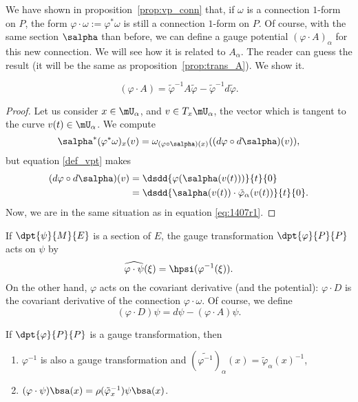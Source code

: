 We have shown in proposition~\ref{prop:vp_conn} that, if $\omega$ is a connection $1$-form on $P$, the form $\varphi\cdot\omega:=\varphi^*\omega$ is still a connection $1$-form on $P$. Of course, with the same section $\salpha$ than before, we can define a gauge potential $(\varphi\cdot A)_{\alpha}$ for this new connection. We will see how it is related to $A_{\alpha}$. The reader can guess the result (it will be the same as proposition~\ref{prop:trans_A}). We show it.

\begin{proposition}		\label{Proptr_de_A}
\begin{equation}\label{tr_de_A}
     (\varphi\cdot A)=\tilde{\varphi}^{-1} A\tilde{\varphi}-\tilde{\varphi}^{-1} d\tilde{\varphi}.
\end{equation}
\end{proposition}
\begin{proof}
Let us consider $x\in\mU_{\alpha}$, and $v\in T_x\mU_{\alpha}$, the vector which is tangent to the curve $v(t)\in\mU_{\alpha}$. We compute
\[
    \salpha^*(\varphi^*\omega)_x(v)=\omega_{(\varphi\circ\salpha)(x)}((d\varphi\circ d\salpha)(v)),
\]
but equation \eqref{def_vpt} makes
\begin{equation}
\begin{split}
   (d\varphi\circ d\salpha)(v)&=\dsdd{\varphi(\salpha(v(t)))}{t}{0}\\
                          &=\dsdd{\salpha(v(t))\cdot\tilde{\varphi}_{\alpha}(v(t))}{t}{0}.
\end{split}
\end{equation}
Now, we are in the same situation as in equation \eqref{eq:1407r1}.
\end{proof}

If $\dpt{\psi}{M}{E}$ is a section of $E$, the gauge transformation $\dpt{\varphi}{P}{P}$ acts on $\psi$ by
\begin{equation}
   \widehat{\varphi\cdot\psi}(\xi)=\hpsi(\varphi^{-1}(\xi)).
\end{equation}
On the other hand, $\varphi$ acts on the covariant derivative (and the potential):
$\varphi\cdot D$ is the covariant derivative  of the connection $\varphi\cdot\omega$. Of course, we define
\begin{equation}
    (\varphi\cdot D)\psi=d\psi-(\varphi\cdot A)\psi.
\end{equation}

\begin{lemma}
If $\dpt{\varphi}{P}{P}$ is a gauge transformation, then
\begin{enumerate}
\item $\varphi^{-1}$ is also a gauge transformation and
             $(\widetilde{\varphi^{-1}})_{\alpha}(x)=\tilde{\varphi}_{\alpha}(x)^{-1}$, \label{lem:i}
\item $(\varphi\cdot\psi)\bsa(x)=\rho(\tilde{\varphi}_x^{-1})\psi\bsa(x)$.\label{lem:ii}
\end{enumerate}
\label{lem:prop_gauge}
\end{lemma}

